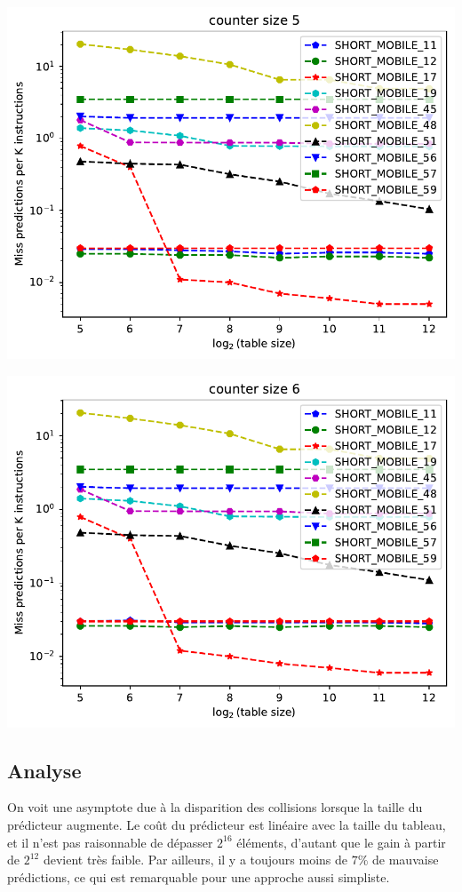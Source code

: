 \documentclass[a4paper]{article}
\begin{document}
\begin{minipage}{.48\linewidth}
\includegraphics[width=\linewidth]{default-predictor/graph_5}
\end{minipage}%
\hfill
\begin{minipage}{.48\linewidth}
\includegraphics[width=\linewidth]{default-predictor/graph_6}
\end{minipage}
\subsection{Analyse}
On voit une asymptote due à la disparition des collisions lorsque la taille du prédicteur augmente.
Le coût du prédicteur est linéaire avec la taille du tableau, et il n'est pas raisonnable de dépasser $2^{16}$ éléments, d'autant que le gain à partir de $2^{12}$ devient très faible.
Par ailleurs, il y a toujours moins de $7\%$ de mauvaise prédictions, ce qui est remarquable pour une approche aussi simpliste.
\end{document}

